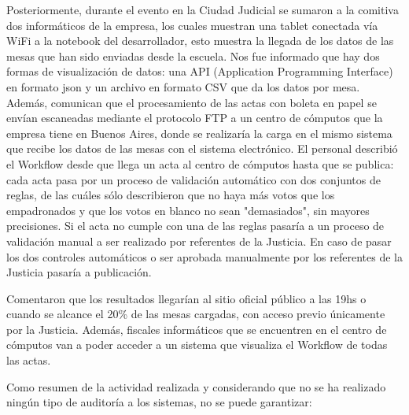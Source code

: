 Posteriormente, durante el evento en la Ciudad Judicial se sumaron a la comitiva dos informáticos de la empresa, los cuales muestran una tablet conectada vía WiFi a la notebook del desarrollador, esto muestra la llegada de los datos de las mesas que han sido enviadas desde la escuela. Nos fue informado que hay dos formas de visualización de datos: una API (Application Programming Interface) en formato json y un archivo en formato CSV que da los datos por mesa. Además, comunican que el procesamiento de las actas con boleta en papel se envían escaneadas mediante el protocolo FTP a un centro de cómputos que la empresa tiene en Buenos Aires, donde se realizaría la carga en el mismo sistema que recibe los datos de las mesas con el sistema electrónico.\newline
El personal describió el Workflow desde que llega un acta al centro de cómputos hasta que se publica: cada acta pasa por un proceso de validación automático con dos conjuntos de reglas, de las cuáles sólo describieron que no haya más votos que los empadronados y que los votos en blanco no sean "demasiados", sin mayores precisiones. Si el acta no cumple con una de las reglas pasaría a un proceso de validación manual a ser realizado por referentes de la Justicia. En caso de pasar los dos controles automáticos o ser aprobada manualmente por los referentes de la Justicia pasaría a publicación.\newline

Comentaron que los resultados llegarían al sitio oficial público a las 19hs o cuando se alcance el 20\% de las mesas cargadas, con acceso previo únicamente por la Justicia. Además, fiscales informáticos que se encuentren en el centro de cómputos van a poder acceder a un sistema que visualiza el Workflow de todas las actas.\newline

Como resumen de la actividad realizada y considerando que no se ha realizado ningún tipo de auditoría a los sistemas, no se puede garantizar:

